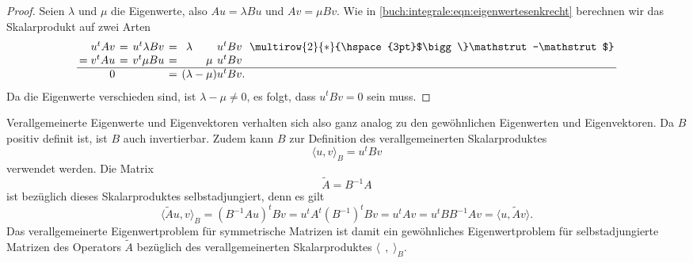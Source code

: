 \begin{proof}
Seien $\lambda$ und $\mu$ die Eigenwerte, also $Au=\lambda Bu$
und $Av=\mu Bv$.
Wie in \eqref{buch:integrale:eqn:eigenwertesenkrecht}
berechnen wir das Skalarprodukt auf zwei Arten
\[
\renewcommand{\arraycolsep}{2pt}
\begin{array}{rcccrl}
 u^tAv &=&u^t\lambda Bv &=& \lambda\phantom{\mathstrut-\mu)} u^tBv\phantom{.}
	&\multirow{2}{*}{\hspace{3pt}$\bigg\}\mathstrut-\mathstrut$}\\
=v^tAu &=&v^t\mu Bu     &=&  \mu\phantom{)}u^tBv\phantom{.}         &\\
\hline
     0 & &              &=& (\lambda - \mu)u^tBv.        &
\end{array}
\]
Da die Eigenwerte verschieden sind, ist $\lambda-\mu\ne 0$, es folgt, 
dass $u^tBv=0$ sein muss.
\end{proof}

Verallgemeinerte Eigenwerte und Eigenvektoren verhalten sich also
ganz analog zu den gewöhnlichen Eigenwerten und Eigenvektoren.
Da $B$ positiv definit ist, ist $B$ auch invertierbar.
%
%
Zudem kann $B$ zur Definition des verallgemeinerten Skalarproduktes
\[
\langle u,v\rangle_B = u^tBv
\]
verwendet werden.
Die Matrix 
\[
\tilde{A} = B^{-1}A
\]
ist bezüglich dieses Skalarproduktes selbstadjungiert, denn es gilt
\[
\langle\tilde{A}u,v\rangle_B
=
(B^{-1}Au)^t Bv
=
u^tA^t(B^{-1})^tBv
=
u^tAv
=
u^tBB^{-1}Av
=
\langle u,\tilde{A}v\rangle.
\]
Das verallgemeinerte Eigenwertproblem für symmetrische Matrizen
ist damit ein gewöhnliches Eigenwertproblem für selbstadjungierte
Matrizen des Operators $\tilde{A}$ bezüglich des verallgemeinerten
Skalarproduktes $\langle\,\;,\;\rangle_B$.

%
%
